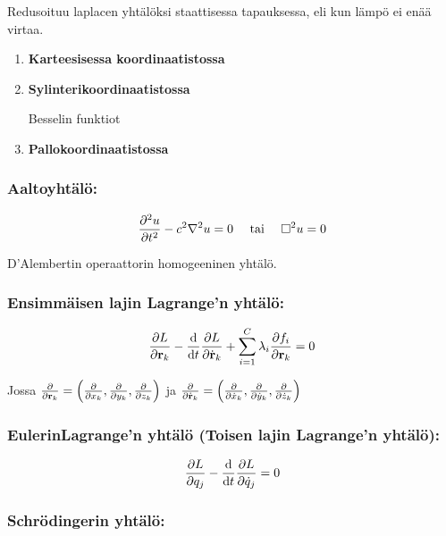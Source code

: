 \documentclass[../johdoksia.tex]{subfiles}
\begin{document}
	Redusoituu laplacen yhtälöksi staattisessa tapauksessa, eli kun lämpö ei enää virtaa.
	
	\begin{enumerate}
		\item \textbf{Karteesisessa koordinaatistossa}
		
		\item \textbf{Sylinterikoordinaatistossa}
		
		Besselin funktiot
		
		\item \textbf{Pallokoordinaatistossa}
	\end{enumerate}
	
	\subsubsection{Aaltoyhtälö:}
	
	\begin{equation}
		\pdv{^2u}{t^2} - c^2\nabla^2u = 0 \ \ \ \ \text{tai} \ \ \ \ \square^2u = 0
	\end{equation}

	D'Alembertin operaattorin homogeeninen yhtälö.
	
	\subsubsection{Ensimmäisen lajin Lagrange'n yhtälö:}
	
	\begin{equation}
		\pdv{L}{\vtr{r}_k} - \odv{}{t}\pdv{L}{\dot{\vtr{r}}_k} + \sum_{i = 1}^{C}\lambda_i\pdv{f_i}{\vtr{r}_k} = 0
	\end{equation}
	
	Jossa $\pdv{}{\mathbf{r}_k} = \left(\pdv{}{x_k}, \pdv{}{y_k}, \pdv{}{z_k}\right)$ ja $\pdv{}{\dot{\mathbf{r}}_k} = \left(\pdv{}{\dot{x}_k}, \pdv{}{\dot{y}_k}, \pdv{}{\dot{z}_k}\right)$
	
	\subsubsection{Eulerin\textendash Lagrange'n yhtälö (Toisen lajin Lagrange'n yhtälö):}
	
	\begin{equation}
		\pdv{L}{q_j} - \odv{}{t}\pdv{L}{\dot{q}_j} = 0
	\end{equation}
	
	\subsubsection{Schrödingerin yhtälö:}
	
\end{document}
